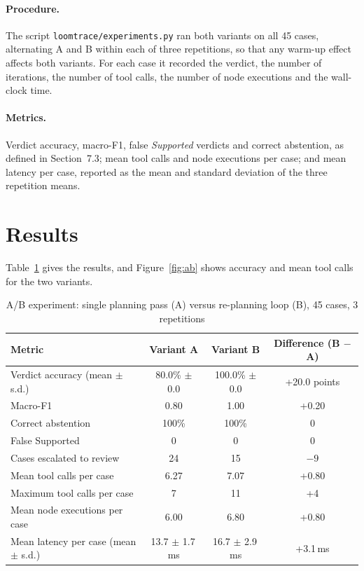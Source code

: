 \paragraph{Procedure.} The script \texttt{loomtrace/experiments.py} ran both variants on all 45 cases,
alternating A and B within each of three repetitions, so that any warm-up effect affects both variants.
For each case it recorded the verdict, the number of iterations, the number of tool calls, the number
of node executions and the wall-clock time.

\paragraph{Metrics.} Verdict accuracy, macro-F1, false \emph{Supported} verdicts and correct abstention,
as defined in Section~7.3; mean tool calls and node executions per case; and mean latency per case,
reported as the mean and standard deviation of the three repetition means.

\section{Results}

Table~\ref{tab:ab} gives the results, and Figure~\ref{fig:ab} shows accuracy and mean tool calls for
the two variants.

\begin{table}[H]
\centering
\caption{A/B experiment: single planning pass (A) versus re-planning loop (B), 45 cases, 3 repetitions}
\label{tab:ab}
\small
\begin{tabularx}{\linewidth}{@{}>{\raggedright\arraybackslash}X c c c@{}}
\toprule
\textbf{Metric} & \textbf{Variant A} & \textbf{Variant B} & \textbf{Difference (B $-$ A)} \\ \midrule
Verdict accuracy (mean $\pm$ s.d.) & 80.0\% $\pm$ 0.0 & 100.0\% $\pm$ 0.0 & +20.0 points \\
Macro-F1 & 0.80 & 1.00 & +0.20 \\
Correct abstention & 100\% & 100\% & 0 \\
False Supported & 0 & 0 & 0 \\
Cases escalated to review & 24 & 15 & $-9$ \\
Mean tool calls per case & 6.27 & 7.07 & +0.80 \\
Maximum tool calls per case & 7 & 11 & +4 \\
Mean node executions per case & 6.00 & 6.80 & +0.80 \\
Mean latency per case (mean $\pm$ s.d.) & 13.7 $\pm$ 1.7\,ms & 16.7 $\pm$ 2.9\,ms & +3.1\,ms \\
\bottomrule
\end{tabularx}
\end{table}

